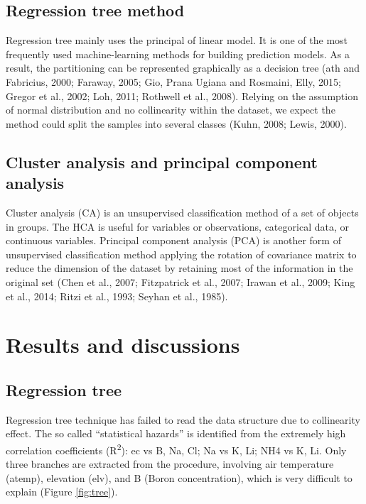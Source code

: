 \documentclass{sciposter}
\begin{document}
\begin{multicols}{3}
\subsection{Regression tree method}
Regression tree mainly uses the principal of linear model. It is one of the most frequently used machine-learning methods for building prediction models. As a result, the partitioning can be represented graphically as a decision tree (ath and Fabricius, 2000; Faraway, 2005; Gio, Prana Ugiana and Rosmaini, Elly, 2015; Gregor et al., 2002; Loh, 2011; Rothwell et al., 2008). Relying on the assumption of normal distribution and no collinearity within the dataset, we expect the method could split the samples into several classes (Kuhn, 2008; Lewis, 2000).

\subsection{Cluster analysis and principal component analysis}
Cluster analysis (CA) is an unsupervised classification method of a set of objects in groups. The HCA is useful for variables or observations, categorical data, or continuous variables. Principal component analysis (PCA) is another form of unsupervised classification method applying the rotation of covariance matrix to reduce the dimension of the dataset by retaining most of the information in the original set (Chen et al., 2007; Fitzpatrick et al., 2007; Irawan et al., 2009; King et al., 2014; Ritzi et al., 1993; Seyhan et al., 1985). 

\section{Results and discussions}

\subsection{Regression tree}
Regression tree technique has failed to read the data structure due to collinearity effect. The so called “statistical hazards” is identified from the extremely high correlation coefficients (R\textsuperscript{2}): ec vs B, Na, Cl; Na vs K, Li; NH4 vs K, Li. Only three branches are extracted from the procedure, involving air temperature (atemp), elevation (elv), and B (Boron concentration), which is very difficult to explain (Figure \ref{fig:tree}).


\end{multicols}
\end{document}

